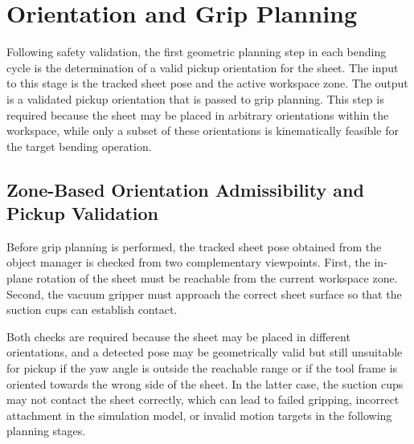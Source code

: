 
\section{Orientation and Grip Planning}
\label{sec:workpiece-orientation}

Following safety validation, the first geometric planning step in each bending cycle is the determination of a valid pickup orientation for the sheet. The input to this stage is the tracked sheet pose and the active workspace zone. The output is a validated pickup orientation that is passed to grip planning. This step is required because the sheet may be placed in arbitrary orientations within the workspace, while only a subset of these orientations is kinematically feasible for the target bending operation.

\subsection{Zone-Based Orientation Admissibility and Pickup Validation}
\label{sec:zone-based-rz-admissibility}
\label{subsec:pickup-orientation-validation}

Before grip planning is performed, the tracked sheet pose obtained from the object manager is checked from two complementary viewpoints. First, the in-plane rotation of the sheet must be reachable from the current workspace zone. Second, the vacuum gripper must approach the correct sheet surface so that the suction cups can establish contact.

Both checks are required because the sheet may be placed in different orientations, and a detected pose may be geometrically valid but still unsuitable for pickup if the yaw angle is outside the reachable range or if the tool frame is oriented towards the wrong side of the sheet. In the latter case, the suction cups may not contact the sheet correctly, which can lead to failed gripping, incorrect attachment in the simulation model, or invalid motion targets in the following planning stages.

